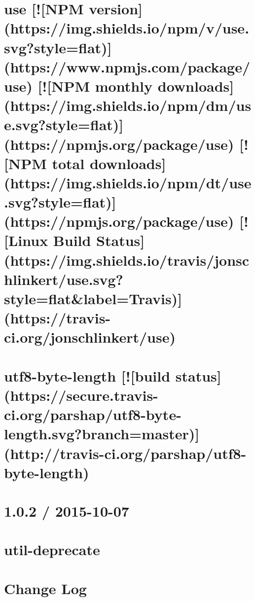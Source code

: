 \documentclass[twoside]{book}
\newcommand{\+}{\discretionary{\mbox{\scriptsize$\hookleftarrow$}}{}{}}
\begin{document}
\chapter{use \mbox{[}!\mbox{[}N\+PM version\mbox{]}(https\+://img.shields.\+io/npm/v/use.svg?style=flat)\mbox{]}(https\+://www.npmjs.\+com/package/use) \mbox{[}!\mbox{[}N\+PM monthly downloads\mbox{]}(https\+://img.shields.\+io/npm/dm/use.svg?style=flat)\mbox{]}(https\+://npmjs.org/package/use) \mbox{[}!\mbox{[}N\+PM total downloads\mbox{]}(https\+://img.shields.\+io/npm/dt/use.svg?style=flat)\mbox{]}(https\+://npmjs.org/package/use) \mbox{[}!\mbox{[}Linux Build Status\mbox{]}(https\+://img.shields.\+io/travis/jonschlinkert/use.svg?style=flat\&label=Travis)\mbox{]}(https\+://travis-\/ci.org/jonschlinkert/use)}
\label{md_dsmacc_vis_degree_node_modules_use_README}

\chapter{utf8-\/byte-\/length \mbox{[}!\mbox{[}build status\mbox{]}(https\+://secure.travis-\/ci.org/parshap/utf8-\/byte-\/length.svg?branch=master)\mbox{]}(http\+://travis-\/ci.org/parshap/utf8-\/byte-\/length)}
\label{md_dsmacc_vis_degree_node_modules_utf8-byte-length_README}

\chapter{1.0.2 / 2015-\/10-\/07}
\label{md_dsmacc_vis_degree_node_modules_util-deprecate_History}

\chapter{util-\/deprecate}
\label{md_dsmacc_vis_degree_node_modules_util-deprecate_README}

\chapter{Change Log}
\label{md_dsmacc_vis_degree_node_modules_uuid_CHANGELOG}

\end{document}
